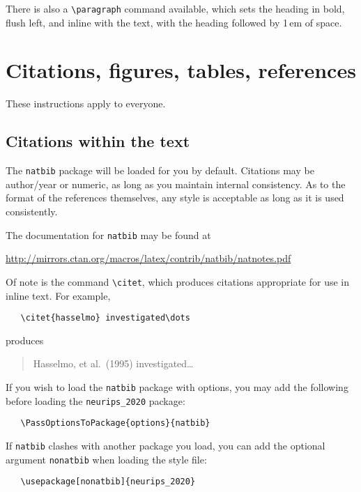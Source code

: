 \documentclass{article}
\begin{document}
There is also a \verb+\paragraph+ command available, which sets the heading in
bold, flush left, and inline with the text, with the heading followed by 1\,em
of space.

\section{Citations, figures, tables, references}
\label{others}

These instructions apply to everyone.

\subsection{Citations within the text}

The \verb+natbib+ package will be loaded for you by default.  Citations may be
author/year or numeric, as long as you maintain internal consistency.  As to the
format of the references themselves, any style is acceptable as long as it is
used consistently.

The documentation for \verb+natbib+ may be found at
\begin{center}
  \url{http://mirrors.ctan.org/macros/latex/contrib/natbib/natnotes.pdf}
\end{center}
Of note is the command \verb+\citet+, which produces citations appropriate for
use in inline text.  For example,
\begin{verbatim}
   \citet{hasselmo} investigated\dots
\end{verbatim}
produces
\begin{quote}
  Hasselmo, et al.\ (1995) investigated\dots
\end{quote}

If you wish to load the \verb+natbib+ package with options, you may add the
following before loading the \verb+neurips_2020+ package:
\begin{verbatim}
   \PassOptionsToPackage{options}{natbib}
\end{verbatim}

If \verb+natbib+ clashes with another package you load, you can add the optional
argument \verb+nonatbib+ when loading the style file:
\begin{verbatim}
   \usepackage[nonatbib]{neurips_2020}
\end{verbatim}
\end{document}
